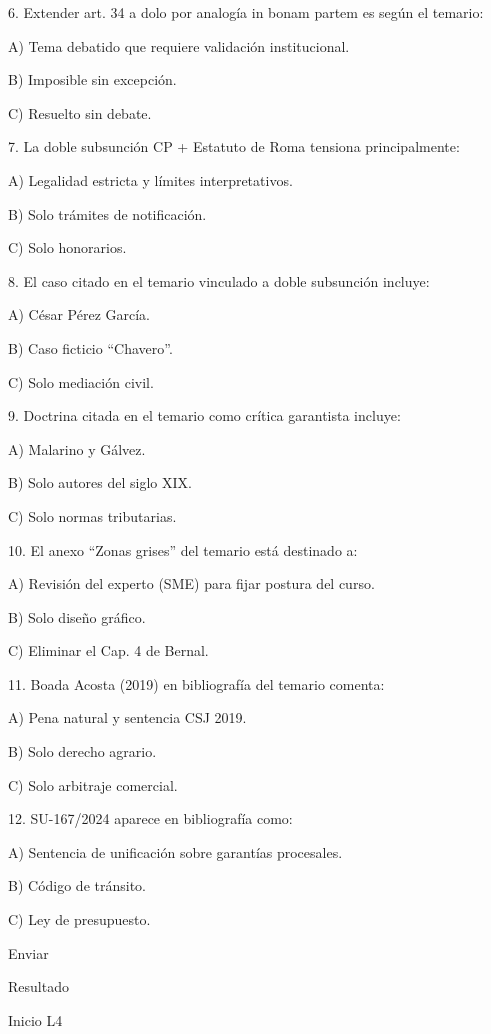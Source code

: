 \documentclass[11pt,a4paper]{article}
\begin{document}
      6. Extender art. 34 a dolo por analogía in bonam partem es según el temario:\par

         A) Tema debatido que requiere validación institucional.\par
         B) Imposible sin excepción.\par
         C) Resuelto sin debate.\par


      7. La doble subsunción CP + Estatuto de Roma tensiona principalmente:\par

         A) Legalidad estricta y límites interpretativos.\par
         B) Solo trámites de notificación.\par
         C) Solo honorarios.\par


      8. El caso citado en el temario vinculado a doble subsunción incluye:\par

         A) César Pérez García.\par
         B) Caso ficticio “Chavero”.\par
         C) Solo mediación civil.\par


      9. Doctrina citada en el temario como crítica garantista incluye:\par

         A) Malarino y Gálvez.\par
         B) Solo autores del siglo XIX.\par
         C) Solo normas tributarias.\par


      10. El anexo “Zonas grises” del temario está destinado a:\par

         A) Revisión del experto (SME) para fijar postura del curso.\par
         B) Solo diseño gráfico.\par
         C) Eliminar el Cap. 4 de Bernal.\par


      11. Boada Acosta (2019) en bibliografía del temario comenta:\par

         A) Pena natural y sentencia CSJ 2019.\par
         B) Solo derecho agrario.\par
         C) Solo arbitraje comercial.\par


      12. SU-167/2024 aparece en bibliografía como:\par

         A) Sentencia de unificación sobre garantías procesales.\par
         B) Código de tránsito.\par
         C) Ley de presupuesto.\par


      Enviar\par


      Resultado\par









    Inicio L4\par
\end{document}

